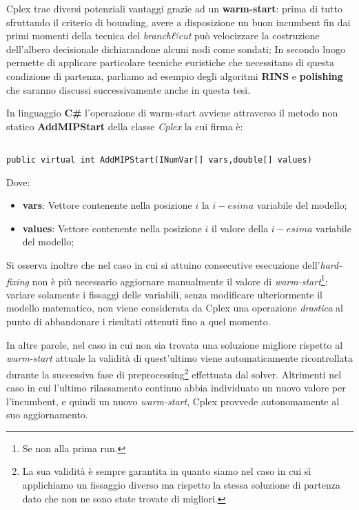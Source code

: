 \documentclass[11pt]{article}
\begin{document}
Cplex trae diversi potenziali vantaggi grazie ad un \textbf{warm-start}: prima di tutto sfruttando il criterio di bounding, avere a disposizione un buon incumbent fin dai primi momenti della tecnica del \textit{branch\&cut} può velocizzare la costruzione dell'albero decisionale dichiarandone alcuni nodi come sondati; In secondo luogo permette di applicare particolare tecniche euristiche che necessitano di questa condizione di partenza, parliamo ad esempio degli algoritmi \textbf{RINS} e \textbf{polishing} che saranno discussi successivamente anche in questa tesi.

In linguaggio \textbf{C\#} l'operazione di warm-start avviene attraverso il metodo non statico \textbf{AddMIPStart} della classe \textit{Cplex} la cui firma è:

\begin{lstlisting}

public virtual int AddMIPStart(INumVar[] vars,double[] values)

\end{lstlisting}

Dove:

\begin{itemize}
    \item \textbf{vars}: Vettore contenente nella posizione $i$ la $i-esima$ variabile del modello;
    \item \textbf{values}: Vettore contenente nella posizione $i$ il valore della $i-esima$ variabile del modello;
\end{itemize}

Si osserva inoltre che nel caso in cui si attuino consecutive esecuzione dell'\textit{hard-fixing} non è più necessario aggiornare manualmente il valore di \textit{warm-start}\footnote{Se non alla prima run.}: variare solamente i fissaggi delle variabili, senza modificare ulteriormente il modello matematico, non viene considerata da Cplex una operazione \textit{drastica} al punto di abbandonare i risultati ottenuti fino a quel momento.

In altre parole, nel caso in cui non sia trovata una soluzione migliore rispetto al \textit{warm-start} attuale la validità di quest'ultimo viene automaticamente ricontrollata durante la successiva fase di preprocessing\footnote{La sua validità è sempre garantita in quanto siamo nel caso in cui sì applichiamo un fissaggio diverso ma rispetto la stessa soluzione di partenza dato che non ne sono state trovate di migliori.} effettuata dal solver. Altrimenti nel caso in cui l'ultimo rilassamento continuo abbia individuato un nuovo valore per l'incumbent, e quindi un nuovo \textit{warm-start}, Cplex provvede autonomamente al suo aggiornamento.
\end{document}
